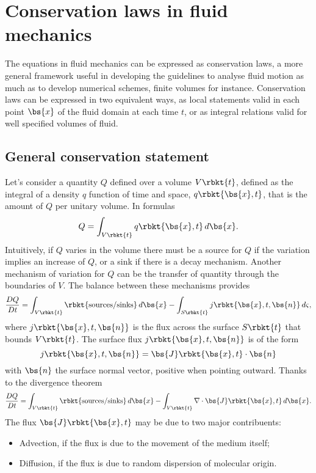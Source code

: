 \section{Conservation laws in fluid mechanics}
The equations in fluid mechanics can be expressed as conservation laws, a more general framework useful in developing the guidelines to analyse fluid motion as much as to develop numerical schemes, finite volumes for instance. Conservation laws can be expressed in two equivalent ways, as local statements valid in each point $\bs{x}$ of the fluid domain at each time $t$, or as integral relations valid for well specified volumes of fluid.
\subsection{General conservation statement}
Let's consider a quantity $Q$ defined over a volume $V\rbkt{t}$, defined as the integral of a density $q$ function of time and space, $q\rbkt{\bs{x},t}$, that is the amount of $Q$ per unitary volume. In formulas
\begin{equation}
    Q =  \int_{V\rbkt{t}}q\rbkt{\bs{x},t}\,d\bs{x}.
\end{equation}
Intuitively, if $Q$ varies in the volume there must be a source for $Q$ if the variation implies an increase of $Q$, or a sink if there is a decay mechanism. Another mechanism of variation for $Q$ can be the transfer of quantity through the boundaries of $V$. The balance between these mechanisms provides
\begin{equation}
    \dfrac{DQ}{Dt} = \int_{V\rbkt{t}} \rbkt{\text{sources/sinks}}\,d\bs{x} - \int_{S\rbkt{t}} j\rbkt{\bs{x},t,\bs{n}} \,d\varsigma,
\end{equation}
where $j\rbkt{\bs{x},t,\bs{n}}$ is the flux across the surface $S\rbkt{t}$ that bounds $V\rbkt{t}$. The surface flux $j\rbkt{\bs{x},t,\bs{n}}$ is of the form
\begin{equation*}
    j\rbkt{\bs{x},t,\bs{n}} = \bs{J}\rbkt{\bs{x},t}\cdot\bs{n}
\end{equation*}
with $\bs{n}$ the surface normal vector, positive when pointing outward. Thanks to the divergence theorem
\begin{equation}\label{eq:balance}
    \dfrac{DQ}{Dt} = \int_{V\rbkt{t}} \rbkt{\text{sources/sinks}}\,d\bs{x} - \int_{V\rbkt{t}} \nabla\cdot \bs{J}\rbkt{\bs{x},t} \,d\bs{x}.
\end{equation}
The flux $\bs{J}\rbkt{\bs{x},t}$ may be due to two major contribuents:
\begin{itemize}
    \item Advection, if the flux is due to the movement of the medium itself;
    \item Diffusion, if the flux is due to random dispersion of molecular origin.
\end{itemize}
